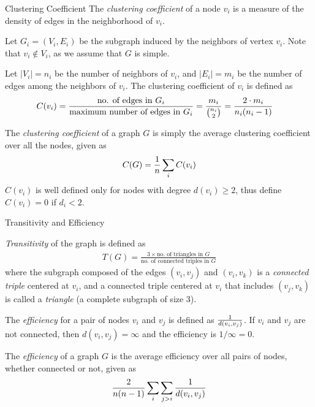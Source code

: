 \begin{frame}{Clustering Coeff\/{i}cient}
The {\em clustering coeff\/{i}cient} of a node $v_i$ is a measure of
the density of edges in the neighborhood of $v_i$.

\smallskip
Let $G_i=(V_i, E_i)$ be the subgraph induced by the neighbors
of vertex $v_i$. Note that $v_i \not\in V_i$, as we assume that $G$
is simple.

\smallskip
Let $|V_i| = n_i$ be the number of neighbors of
$v_i$, and $|E_i| = m_i$ be the number of edges among the
neighbors of $v_i$.
The clustering coeff\/{i}cient of $v_i$ is def\/{i}ned as
\begin{align*}
    C(v_i) & = \frac{\text{no. of edges in $G_i$}}{\text{maximum
    number of edges in $G_i$}} = {m_i \over {n_i \choose 2}}
    = \frac{2 \cdot m_i}{n_i (n_i-1)}
\end{align*}

The {\em clustering coeff\/{i}cient} of a graph $G$ is simply the
average clustering coeff\/{i}cient over all the nodes, given as
\begin{align*}
    C(G) = {1 \over n} \sum_i C(v_i)
\end{align*}
$C(v_i)$ is well def\/{i}ned only for nodes with
degree $d(v_i) \ge 2$, thus
def\/{i}ne ${C(v_i) = 0}$ if $d_i < 2$.
\end{frame}
%

\begin{frame}{Transitivity and Efficiency}

  {\em Transitivity} of the graph is def\/{i}ned
as
\begin{align*}
    T(G) = \frac{3 \times \text{no. of triangles in } G}
    {\text{no. of connected triples in } G}
\end{align*}
where the subgraph composed of the edges
$(v_i,v_{j})$ and $(v_i, v_k)$ is a {\em connected triple}
centered at $v_i$, and a connected
triple centered at $v_i$ that includes $(v_{j}, v_k)$ is called a
{\em triangle} (a complete
subgraph of size 3).


\bigskip
The {\em eff\/{i}ciency} for a pair of nodes $v_i$ and $v_{j}$
is def\/{i}ned as
${1 \over d(v_i, v_{j})}$.
If $v_i$ and $v_{j}$ are not connected, then $d(v_i,v_{j}) = \infty$
and the eff\/{i}ciency is $1/\infty = 0$.

The {\em eff\/{i}ciency} of a graph $G$ is the average
eff\/{i}ciency over all pairs of nodes, whether
connected or not, given as
\begin{align*}
    {2 \over n(n-1)} \sum_{i} \sum_{j>i} {1 \over d(v_i, v_{j})}
\end{align*}

\end{frame}




